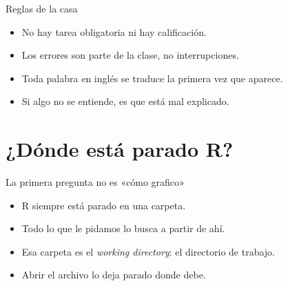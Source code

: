 \begin{frame}{Reglas de la casa}
  \vspace{0.3em}
  \begin{itemize}\setlength{\itemsep}{0.9em}
    \item<1-> No hay tarea obligatoria ni hay calificación.
    \item<2-> Los errores son parte de la clase, no interrupciones.
    \item<3-> Toda palabra en inglés se traduce la primera vez que aparece.
    \item<4-> Si algo no se entiende, es que está mal explicado.
  \end{itemize}

  \vspace{1.1em}
\end{frame}

\section{¿Dónde está parado R?}

\begin{frame}{La primera pregunta no es «cómo grafico»}
  \vspace{0.3em}
  \begin{itemize}\setlength{\itemsep}{0.85em}
    \item<1-> R siempre está parado en una carpeta.
    \item<2-> Todo lo que le pidamos lo busca a partir de ahí.
    \item<3-> Esa carpeta es el \textit{working directory}: el directorio de trabajo.
    \item<4-> Abrir el archivo  lo deja parado donde debe.
  \end{itemize}

  \vspace{1.0em}
\end{frame}

